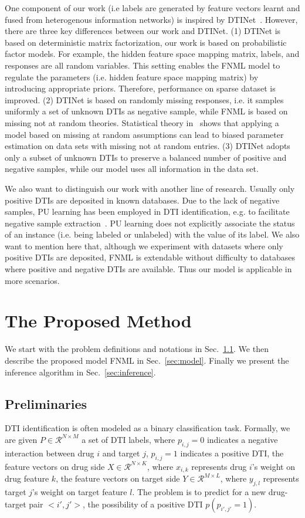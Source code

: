 \documentclass[journal]{IEEEtran}
\begin{document}
One component of our work (i.e labels are generated by feature vectors learnt and fused from heterogenous information networks) is inspired by  DTINet~\cite{Luo2017Network}. However, there are three key differences between our work and DTINet. (1) DTINet is based on deterministic matrix factorization, our work is based on probabilistic factor models. For example, the hidden feature space mapping matrix, labels, and responses are all random variables. This setting enables the FNML model to regulate the parameters (i.e. hidden feature space mapping matrix) by introducing appropriate priors. Therefore, performance on sparse dataset is improved. (2) DTINet is based on randomly missing responses, i.e. it samples uniformly a set of unknown DTIs as negative sample, while FNML is based on missing not at random theories. Statistical theory in~\cite{Little1987Statistical} shows that applying a model based on missing at random assumptions can lead to biased parameter estimation on data sets with missing not at random entries. (3) DTINet adopts only a subset of unknown DTIs to preserve a balanced number of positive and negative samples, while our model uses all information in the data set.

We also want to distinguish our work with another line of research. Usually only positive DTIs are deposited in known databases. Due to the lack of negative samples, PU learning has been employed in DTI identification, e.g. to facilitate negative sample extraction~\cite{Peng2017Screening}. PU learning does not explicitly associate the status of an instance (i.e. being labeled or unlabeled) with the value of its label. We also want to mention here that, although we experiment with datasets where only positive DTIs are deposited, FNML is extendable without difficulty to databases where positive and negative DTIs are available. Thus our model is applicable in more scenarios.

\section{The Proposed Method}\label{sec:method}
We start with the problem definitions and notations in Sec.~\ref{sec:input}. We then describe the proposed model FNML in Sec.~\ref{sec:model}. Finally we present the inference algorithm in Sec.~\ref{sec:inference}.

\subsection{Preliminaries}\label{sec:input}
DTI identification is often modeled as a binary classification task. Formally, we are given $P\in \mathcal{R}^{N\times M}$ a set of DTI labels, where $p_{i,j}=0$ indicates a negative interaction between drug $i$ and target $j$, $p_{i,j}=1$ indicates a positive DTI, the feature vectors on drug side $X\in \mathcal{R}^{N \times K}$, where $x_{i,k}$ represents drug $i$'s weight on drug feature $k$, the feature vectors on target side $Y\in \mathcal{R}^{M \times L}$, where $y_{j,l}$ represents target $j$'s weight on target feature $l$. The problem is to predict for a new drug-target pair $<i',j'>$, the possibility of a positive DTI $p(p_{i',j'}=1)$.
\end{document}
